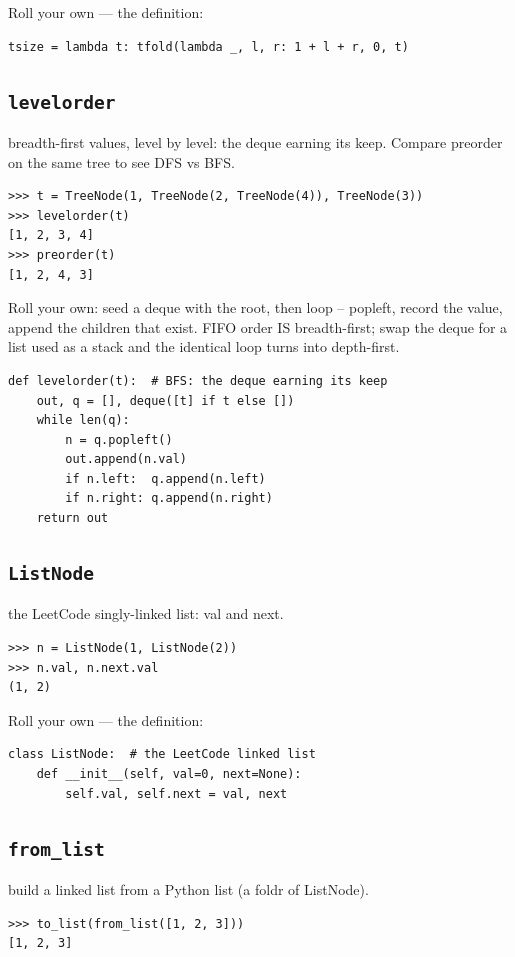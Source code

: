\documentclass[10pt,letterpaper]{book}
\begin{document}
Roll your own --- the definition:

\begin{lstlisting}[style=ex]
tsize = lambda t: tfold(lambda _, l, r: 1 + l + r, 0, t)
\end{lstlisting}
\subsection{\texttt{levelorder}}\label{def:levelorder}
breadth-first values, level by level: the deque earning its keep. Compare preorder on the same tree to see DFS vs BFS.
\begin{lstlisting}[style=ex]
>>> t = TreeNode(1, TreeNode(2, TreeNode(4)), TreeNode(3))
>>> levelorder(t)
[1, 2, 3, 4]
>>> preorder(t)
[1, 2, 4, 3]
\end{lstlisting}

Roll your own: seed a deque with the root, then loop -- popleft, record the value, append the children that exist. FIFO order IS breadth-first; swap the deque for a list used as a stack and the identical loop turns into depth-first.

\begin{lstlisting}[style=ex]
def levelorder(t):  # BFS: the deque earning its keep
    out, q = [], deque([t] if t else [])
    while len(q):
        n = q.popleft()
        out.append(n.val)
        if n.left:  q.append(n.left)
        if n.right: q.append(n.right)
    return out
\end{lstlisting}
\subsection{\texttt{ListNode}}\label{def:ListNode}
the LeetCode singly-linked list: val and next.
\begin{lstlisting}[style=ex]
>>> n = ListNode(1, ListNode(2))
>>> n.val, n.next.val
(1, 2)
\end{lstlisting}

Roll your own --- the definition:

\begin{lstlisting}[style=ex]
class ListNode:  # the LeetCode linked list
    def __init__(self, val=0, next=None):
        self.val, self.next = val, next
\end{lstlisting}
\subsection{\texttt{from\_list}}\label{def:from-list}
build a linked list from a Python list (a foldr of ListNode).
\begin{lstlisting}[style=ex]
>>> to_list(from_list([1, 2, 3]))
[1, 2, 3]
\end{lstlisting}
\end{document}
